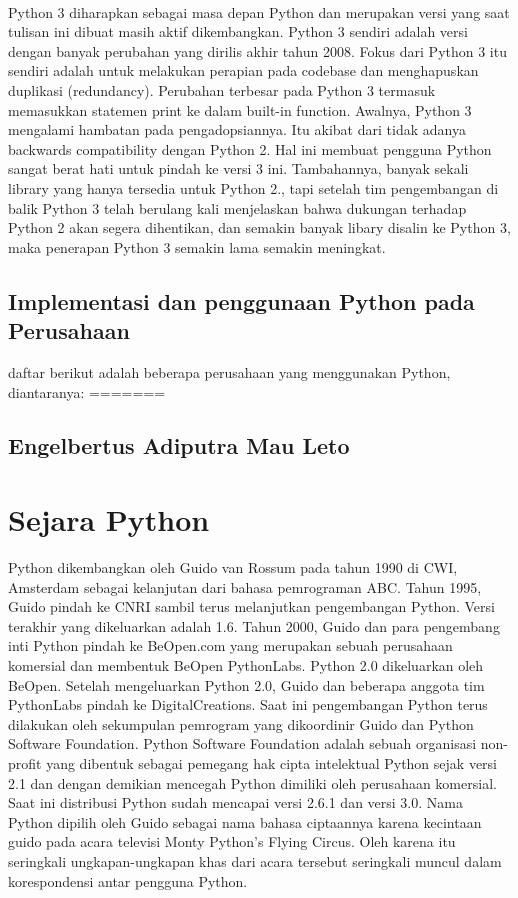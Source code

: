 \paragraph{}
Python 3 diharapkan sebagai masa depan Python dan merupakan versi yang saat tulisan ini dibuat masih aktif dikembangkan. Python 3 sendiri adalah versi dengan banyak perubahan yang dirilis akhir tahun 2008. Fokus dari Python 3 itu sendiri adalah untuk melakukan perapian pada codebase dan menghapuskan duplikasi (redundancy). Perubahan terbesar pada Python 3 termasuk memasukkan statemen print ke dalam built-in function. Awalnya, Python 3 mengalami hambatan pada pengadopsiannya. Itu akibat dari tidak adanya backwards compatibility dengan Python 2. Hal ini membuat pengguna Python sangat berat hati untuk pindah ke versi 3 ini. Tambahannya, banyak sekali library yang hanya tersedia untuk Python 2., tapi setelah tim pengembangan di balik Python 3 telah berulang kali menjelaskan bahwa dukungan terhadap Python 2 akan segera dihentikan, dan semakin banyak libary disalin ke Python 3, maka penerapan Python 3 semakin lama semakin meningkat.
\subsection{Implementasi dan penggunaan Python pada Perusahaan}
daftar berikut adalah beberapa perusahaan yang menggunakan Python, diantaranya:
=======
\subsection{Engelbertus Adiputra Mau Leto}
\section{Sejara Python}
              Python dikembangkan oleh Guido van Rossum pada tahun 1990 di CWI, Amsterdam sebagai kelanjutan dari bahasa pemrograman ABC. Tahun 1995, Guido pindah ke CNRI sambil terus melanjutkan pengembangan Python. Versi terakhir yang dikeluarkan adalah 1.6. Tahun 2000, Guido dan para pengembang inti Python pindah ke BeOpen.com yang merupakan sebuah perusahaan komersial dan membentuk BeOpen PythonLabs. Python 2.0 dikeluarkan oleh BeOpen. Setelah mengeluarkan Python 2.0, Guido dan beberapa anggota tim PythonLabs pindah ke DigitalCreations. Saat ini pengembangan Python terus dilakukan oleh sekumpulan pemrogram yang dikoordinir Guido dan Python Software Foundation. Python Software Foundation adalah sebuah organisasi non-profit yang dibentuk sebagai pemegang hak cipta intelektual Python sejak versi 2.1 dan dengan demikian mencegah Python dimiliki oleh perusahaan komersial. Saat ini distribusi Python sudah mencapai versi 2.6.1 dan versi 3.0. Nama Python dipilih oleh Guido sebagai nama bahasa ciptaannya karena kecintaan guido pada acara televisi Monty Python's Flying Circus. Oleh karena itu seringkali ungkapan-ungkapan khas dari acara tersebut seringkali muncul dalam korespondensi antar pengguna Python. 

